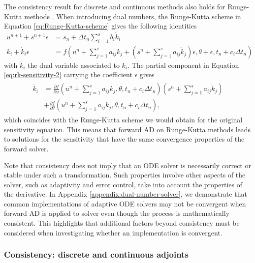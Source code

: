 The consistency result for discrete and continuous methods also holds for Runge-Kutta methods \cite{Walther_2007}. 
When introducing dual numbers, the Runge-Kutta scheme in Equation \eqref{eq:Runge-Kutta-scheme} gives the following identities
\begin{align}
    u^{n+1} + s^{n+1} \epsilon 
    &= 
    s_n + \Delta t_n \sum_{i=1}^s b_i \dot k_i
    \\
    k_i + \dot k_i \epsilon
    &= 
    f \left(u^n + \sum_{j=1}^s a_{ij} k_j + \left( s^n + \sum_{j=1}^s a_{ij} \dot k_j \right) \epsilon , \theta + \epsilon ,  t_n + c_i \Delta t_n \right) \label{eq:rk-sensitivity-2}
\end{align}
with $\dot k_i$ the dual variable associated to $k_i$.
The partial component in Equation \eqref{eq:rk-sensitivity-2} carrying the coefficient $\epsilon$ gives 
\begin{align}
\begin{split}
    \dot k_i
    &= 
    \frac{\partial f}{\partial u} 
    \left(u^n + \sum_{j=1}^s a_{ij} k_j, \theta,  t_n + c_i \Delta t_n \right)
    \left( s^n + \sum_{j=1}^s a_{ij} \dot k_j \right) \\
    &+ 
    \frac{\partial f}{\partial \theta} 
    \left(u^n + \sum_{j=1}^s a_{ij} k_j, \theta,  t_n + c_i \Delta t_n \right),
\end{split}
\end{align}
which coincides with the Runge-Kutta scheme we would obtain for the original sensitivity equation. 
This means that forward AD on Runge-Kutta methods leads to solutions for the sensitivity that have the same convergence properties of the forward solver. 

Note that consistency does not imply that an ODE solver is necessarily correct or stable under such a transformation. 
Such properties involve other aspects of the solver, such as adaptivity and error control, take into account the properties of the derivative. 
In Appendix \ref{appendix:dual-number-solver}, we demonstrate that common implementations of adaptive ODE solvers may not be convergent when forward AD is applied to solver even though the process is mathematically consistent. 
This highlights that additional factors beyond consistency must be considered when investigating whether an implementation is convergent.

\subsubsection{Consistency: discrete and continuous adjoints}

